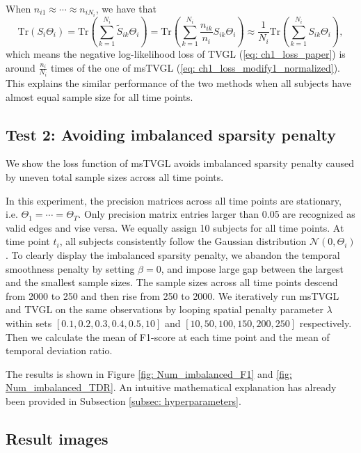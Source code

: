When $n_{i1}\approx\cdots\approx n_{iN_i}$, 
we have that 
\begin{equation*}
    \text{Tr}(S_i\Theta_i) = \text{Tr}(\sum_{k=1}^{N_i}\tilde{S}_{ik}\Theta_i)
    = \text{Tr}(\sum_{k=1}^{N_i}\frac{n_{ik}}{n_i}S_{ik}\Theta_i)
    \approx \frac{1}{N_i}\text{Tr}(\sum_{k=1}^{N_i}S_{ik}\Theta_i),  
\end{equation*}
which means the negative log-likelihood loss of TVGL (\ref{eq: ch1_loss_paper}) is around $\frac{n_i}{N_i}$ times of the one of msTVGL (\ref{eq: ch1_loss_modify1_normalized}). 
This explains the similar performance of the two methods when all subjects have almost equal sample size for all time points. 

\subsection{Test 2: Avoiding imbalanced sparsity penalty}
We show the loss function of msTVGL avoids imbalanced sparsity penalty caused by uneven total sample sizes across all time points. 

In this experiment, 
the precision matrices across all time points are stationary, i.e. $\Theta_1=\cdots=\Theta_T$.
Only precision matrix entries larger than 0.05 are recognized as valid edges and vise versa. 
We equally assign 10 subjects for all time points. 
At time point $t_i$, all subjects consistently follow the Gaussian distribution $\mathcal{N}(0,\Theta_i)$. 
To clearly display the imbalanced sparsity penalty, 
we abandon the temporal smoothness penalty by setting $\beta=0$,
and impose large gap between the largest and the smallest sample sizes. 
The sample sizes across all time points descend from 2000 to 250 and then rise from 250 to 2000. 
We iteratively run msTVGL and TVGL on the same observations by looping spatial penalty parameter $\lambda$ within sets 
$[0.1, 0.2, 0.3, 0.4, 0.5, 10]$ and $[10, 50, 100, 150, 200, 250]$ respectively. 
Then we calculate the mean of F1-score at each time point and the mean of temporal deviation ratio. 

The results is shown in Figure \ref{fig: Num_imbalanced_F1} and \ref{fig: Num_imbalanced_TDR}.
An intuitive mathematical explanation has already been provided in Subsection \ref{subsec: hyperparameters}. 

\subsection{Result images}

